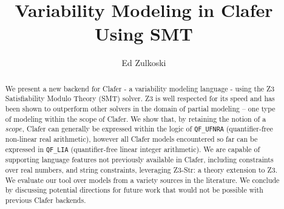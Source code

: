 \documentclass{easychair}
\begin{document}
%
\title{Variability Modeling in Clafer Using SMT}



%
\author{
Ed Zulkoski\\
}




\clearpage

\maketitle

\begin{abstract}
We present a new backend for Clafer - a variability modeling language - using the Z3 Satisfiability Modulo Theory (SMT) solver. Z3 is well respected for its speed and has been shown to outperform other solvers in the domain of partial modeling -- one type of modeling within the scope of Clafer. We show that, by retaining the notion of a $scope$, Clafer can generally be expressed within the logic of \texttt{QF\_UFNRA} (quantifier-free non-linear real arithmetic), however all Clafer models encountered so far can be expressed in \texttt{QF\_LIA} (quantifier-free linear integer arithmetic). We are capable of supporting language features not previously available in Clafer, including constraints over real numbers, and string constraints, leveraging Z3-Str: a theory extension to Z3. We evaluate our tool over models from a variety sources in the literature. We conclude by discussing potential directions for future work that would not be possible with previous Clafer backends.
\end{abstract}
\end{document}
